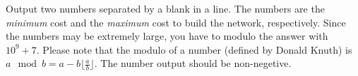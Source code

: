Output two numbers separated by a blank in a line.
The numbers are the \emph{minimum} cost and the \emph{maximum} cost to build 
the network, respectively. 
Since the numbers may be extremely large, you have to modulo the answer with 
$10^9 + 7$.
Please note that the modulo of a number (defined by Donald Knuth) is 
$a\mod b = a - b \lfloor \frac a b \rfloor$. 
The number output should be non-negetive.
